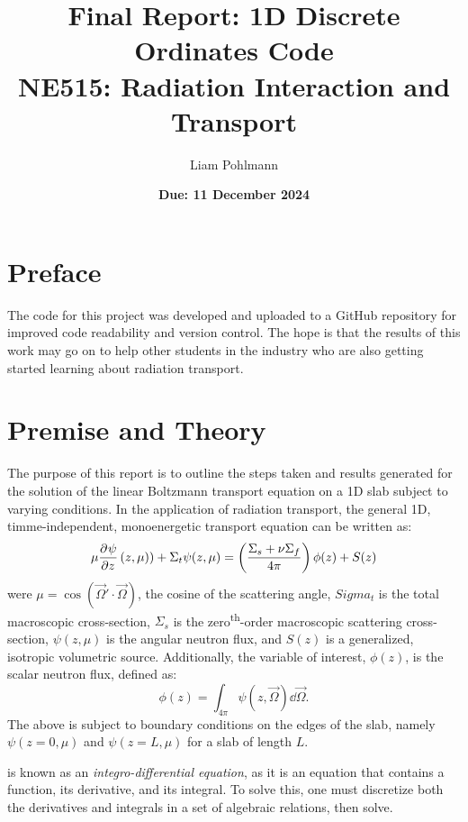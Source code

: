 \documentclass{NE515}
\title{\textbf{Final Report: 1D Discrete Ordinates Code}\\ \vspace{1em}
NE515: Radiation Interaction and Transport}
\author[1]{Liam Pohlmann}
\affil[1]{University of New Mexico, Department of Nuclear Engineering}
\date{\textbf{Due: 11 December 2024}}
\theoremstyle{definition}
\begin{document}
    \maketitle
    \tableofcontents
    \listoffigures
    \clearpage

    \section*{Preface}
    The code for this project was developed and uploaded to a GitHub repository for improved code readability and version control.
    The hope is that the results of this work may go on to help other students in the industry who are also getting started learning about radiation transport.


    \section{Premise and Theory}
    The purpose of this report is to outline the steps taken and results generated for the solution of the linear Boltzmann transport equation on a 1D slab subject to varying conditions.
    In the application of radiation transport, the general 1D, timme-independent, monoenergetic transport equation can be written as:
    \begin{equation}
        \label{eq:1d-transport-equation}
        \mu \pdv[]{\psi }{z}\left( z,\mu ) \right)+\Sigma_t \psi (z,\mu)=\left( \frac{\Sigma_s+\nu\Sigma_f}{4\pi} \right)\phi(z)+S(z)
    \end{equation}
    were $\mu=\cos(\vec{\Omega}'\cdot \vec{\Omega})$, the cosine of the scattering angle, $Sigma_t$ is the total macroscopic cross-section, $\Sigma_s$ is the zero\textsuperscript{th}-order macroscopic scattering cross-section, $\psi(z,\mu)$ is the angular neutron flux, and $S(z)$ is a generalized, isotropic volumetric source.
    Additionally, the variable of interest, $\phi(z)$, is the scalar neutron flux, defined as:
    \begin{equation}
        \label{eq:phi-definition}
        \phi(z)=\int_{4\pi}^{}\psi(z,\vec{\Omega})\dd \vec{\Omega}.
    \end{equation}
    The above is subject to boundary conditions on the edges of the slab, namely $\psi(z=0,\mu)$ and $\psi(z=L,\mu)$ for a slab of length $L$.

     is known as an \textit{integro-differential equation}, as it is an equation that contains a function, its derivative, and its integral.
    To solve this, one must discretize both the derivatives and integrals in a set of algebraic relations, then solve.
\end{document}
